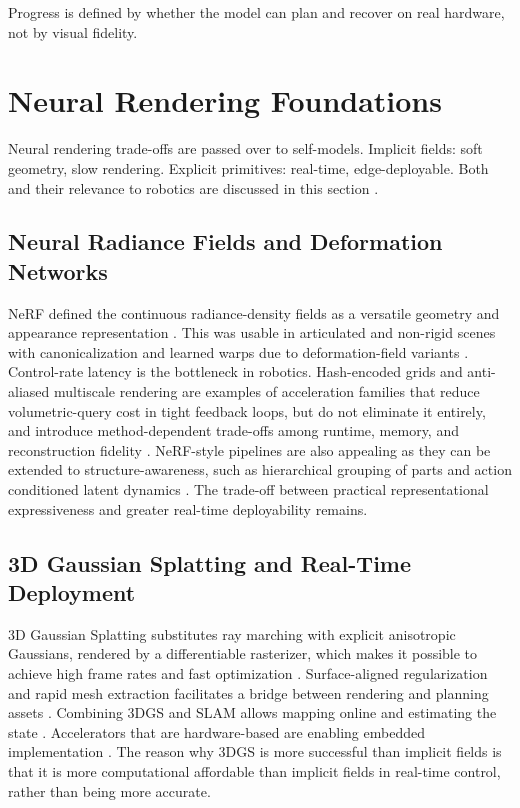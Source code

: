 \documentclass[11pt,a4paper]{article}
\begin{document}
Progress is defined by whether the model can plan and recover on real hardware, not by visual fidelity.


\section{Neural Rendering Foundations}
\label{sec:neural_rendering}

Neural rendering trade-offs are passed over to self-models. Implicit fields: soft geometry, slow rendering. Explicit primitives: real-time, edge-deployable. Both and their relevance to robotics are discussed in this section \cite{chen2022full,schulze2024high,hu2025learning}.

\subsection{Neural Radiance Fields and Deformation Networks}

NeRF defined the continuous radiance-density fields as a versatile geometry and appearance representation \cite{mildenhall2020nerf}. This was usable in articulated and non-rigid scenes with canonicalization and learned warps due to deformation-field variants \cite{pumarola2021d,park2021nerfies}. Control-rate latency is the bottleneck in robotics. Hash-encoded grids and anti-aliased multiscale rendering are examples of acceleration families that reduce volumetric-query cost in tight feedback loops, but do not eliminate it entirely, and introduce method-dependent trade-offs among runtime, memory, and reconstruction fidelity \cite{muller2022instant,barron2021mip,barron2023zipnerf}. NeRF-style pipelines are also appealing as they can be extended to structure-awareness, such as hierarchical grouping of parts and action conditioned latent dynamics \cite{kim2024garfield,li2021nerf}. The trade-off between practical representational expressiveness and greater real-time deployability remains.

\subsection{3D Gaussian Splatting and Real-Time Deployment}

3D Gaussian Splatting substitutes ray marching with explicit anisotropic Gaussians, rendered by a differentiable rasterizer, which makes it possible to achieve high frame rates and fast optimization \cite{kerbl20233d}. Surface-aligned regularization and rapid mesh extraction facilitates a bridge between rendering and planning assets \cite{guedon2024sugar}. Combining 3DGS and SLAM allows mapping online and estimating the state \cite{matsuki2024gaussian,keetha2024splattam}. Accelerators that are hardware-based are enabling embedded implementation \cite{lassanske2024gaurast}. The reason why 3DGS is more successful than implicit fields is that it is more computational affordable than implicit fields in real-time control, rather than being more accurate.
\end{document}
